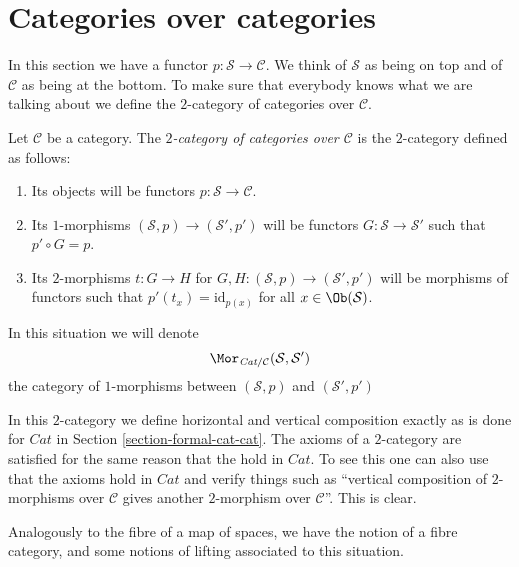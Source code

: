\section{Categories over categories}
\label{section-categories-over-categories}

\noindent
In this section we have a functor $p : \mathcal{S} \to \mathcal{C}$.
We think of $\mathcal{S}$ as being on top and of $\mathcal{C}$ as being
at the bottom. To make sure that everybody knows what we are talking about
we define the $2$-category of categories over $\mathcal{C}$.

\begin{definition}
\label{definition-categories-over-C}
Let $\mathcal{C}$ be a category.
The {\it $2$-category of categories over $\mathcal{C}$}
is the $2$-category defined as follows:
\begin{enumerate}
\item Its objects will be functors $p : \mathcal{S} \to \mathcal{C}$.
\item Its $1$-morphisms $(\mathcal{S}, p) \to (\mathcal{S}', p')$
will be functors $G : \mathcal{S} \to \mathcal{S}'$ such that
$p' \circ G = p$.
\item Its $2$-morphisms $t : G \to H$ for
$G, H : (\mathcal{S}, p) \to (\mathcal{S}', p')$
will be morphisms of functors
such that $p'(t_x) = \text{id}_{p(x)}$
for all $x \in \Ob(\mathcal{S})$.
\end{enumerate}
In this situation we will denote
$$
\Mor_{\textit{Cat}/\mathcal{C}}(\mathcal{S}, \mathcal{S}')
$$
the category of $1$-morphisms between
$(\mathcal{S}, p)$ and $(\mathcal{S}', p')$
\end{definition}

\noindent
In this $2$-category we define horizontal and vertical composition
exactly as is done for $\textit{Cat}$ in Section \ref{section-formal-cat-cat}.
The axioms of a $2$-category are satisfied for the same reason
that the hold in $\textit{Cat}$. To see this one can also use that
the axioms hold in $\textit{Cat}$ and verify
things such as ``vertical composition of $2$-morphisms over $\mathcal{C}$
gives another $2$-morphism over $\mathcal{C}$''. This is clear.

\medskip\noindent
Analogously to the fibre of a map of spaces, we have the notion of a
fibre category, and some notions of lifting associated to this
situation.

